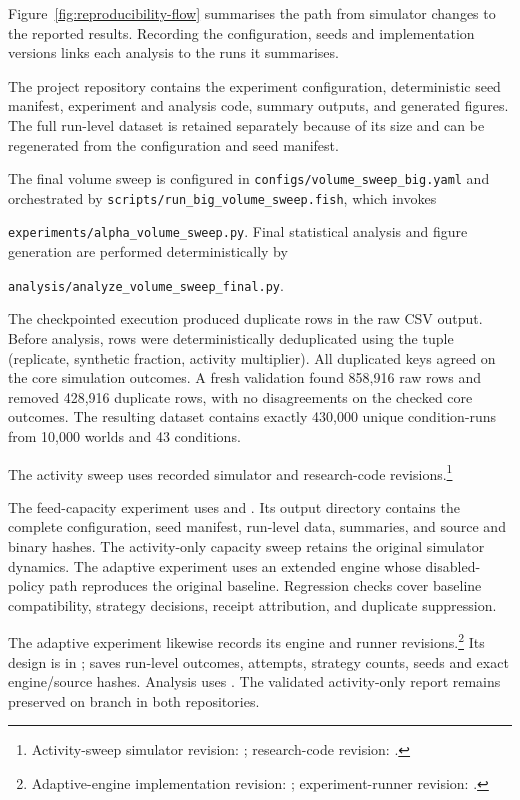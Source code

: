 \documentclass[runningheads]{llncs}
\begin{document}
Figure~\ref{fig:reproducibility-flow} summarises the path from simulator changes to the reported results. Recording the configuration, seeds and implementation versions links each analysis to the runs it summarises.



The project repository contains the experiment configuration, deterministic seed manifest, experiment and analysis code, summary outputs, and generated figures. The full run-level dataset is retained separately because of its size and can be regenerated from the configuration and seed manifest.

The final volume sweep is configured in \texttt{configs/volume\_sweep\_big.yaml} and orchestrated by \texttt{scripts/run\_big\_volume\_sweep.fish}, which invokes

\texttt{experiments/alpha\_volume\_sweep.py}. Final statistical analysis and figure generation are performed deterministically by

\texttt{analysis/analyze\_volume\_sweep\_final.py}.

The checkpointed execution produced duplicate rows in the raw CSV output. Before analysis, rows were deterministically deduplicated using the tuple (replicate, synthetic fraction, activity multiplier). All duplicated keys agreed on the core simulation outcomes. A fresh validation found 858,916 raw rows and removed 428,916 duplicate rows, with no disagreements on the checked core outcomes. The resulting dataset contains exactly 430,000 unique condition-runs from 10,000 worlds and 43 conditions.

The activity sweep uses recorded simulator and research-code revisions.\footnote{Activity-sweep simulator revision: ; research-code revision: .}

The feed-capacity experiment uses
and . Its output directory contains the complete configuration, seed manifest, run-level data, summaries, and source and binary hashes. The activity-only capacity sweep retains the original simulator dynamics. The adaptive experiment uses an extended engine whose disabled-policy path reproduces the original baseline. Regression checks cover baseline compatibility, strategy decisions, receipt attribution, and duplicate suppression.

The adaptive experiment likewise records its engine and runner revisions.\footnote{Adaptive-engine implementation revision: ; experiment-runner revision: .} Its design is in ;  saves run-level outcomes, attempts, strategy counts, seeds and exact engine/source hashes. Analysis uses . The validated activity-only report remains preserved on branch  in both repositories.
\end{document}
